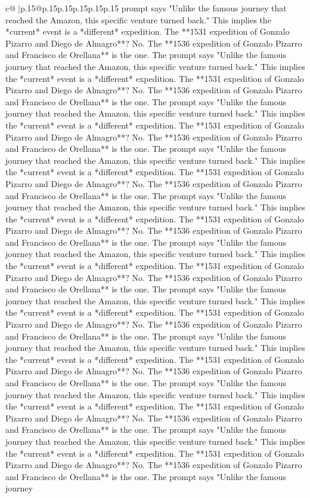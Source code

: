 \documentclass{article}
\begin{document}
{\begin{supertabular}{c@{$\;$}|p{.15\linewidth}@{}p{.15\linewidth}p{.15\linewidth}p{.15\linewidth}p{.15\linewidth}p{.15\linewidth}}
{{{prompt says "Unlike the famous journey that reached the Amazon, this specific venture turned back." This implies the *current* event is a *different* expedition. The **1531 expedition of Gonzalo Pizarro and Diego de Almagro**? No. The **1536 expedition of Gonzalo Pizarro and Francisco de Orellana** is the one. The prompt says "Unlike the famous journey that reached the Amazon, this specific venture turned back." This implies the *current* event is a *different* expedition. The **1531 expedition of Gonzalo Pizarro and Diego de Almagro**? No. The **1536 expedition of Gonzalo Pizarro and Francisco de Orellana** is the one. The prompt says "Unlike the famous journey that reached the Amazon, this specific venture turned back." This implies the *current* event is a *different* expedition. The **1531 expedition of Gonzalo Pizarro and Diego de Almagro**? No. The **1536 expedition of Gonzalo Pizarro and Francisco de Orellana** is the one. The prompt says "Unlike the famous journey that reached the Amazon, this specific venture turned back." This implies the *current* event is a *different* expedition. The **1531 expedition of Gonzalo Pizarro and Diego de Almagro**? No. The **1536 expedition of Gonzalo Pizarro and Francisco de Orellana** is the one. The prompt says "Unlike the famous journey that reached the Amazon, this specific venture turned back." This implies the *current* event is a *different* expedition. The **1531 expedition of Gonzalo Pizarro and Diego de Almagro**? No. The **1536 expedition of Gonzalo Pizarro and Francisco de Orellana** is the one. The prompt says "Unlike the famous journey that reached the Amazon, this specific venture turned back." This implies the *current* event is a *different* expedition. The **1531 expedition of Gonzalo Pizarro and Diego de Almagro**? No. The **1536 expedition of Gonzalo Pizarro and Francisco de Orellana** is the one. The prompt says "Unlike the famous journey that reached the Amazon, this specific venture turned back." This implies the *current* event is a *different* expedition. The **1531 expedition of Gonzalo Pizarro and Diego de Almagro**? No. The **1536 expedition of Gonzalo Pizarro and Francisco de Orellana** is the one. The prompt says "Unlike the famous journey that reached the Amazon, this specific venture turned back." This implies the *current* event is a *different* expedition. The **1531 expedition of Gonzalo Pizarro and Diego de Almagro**? No. The **1536 expedition of Gonzalo Pizarro and Francisco de Orellana** is the one. The prompt says "Unlike the famous journey that reached the Amazon, this specific venture turned back." This implies the *current* event is a *different* expedition. The **1531 expedition of Gonzalo Pizarro and Diego de Almagro**? No. The **1536 expedition of Gonzalo Pizarro and Francisco de Orellana** is the one. The prompt says "Unlike the famous journey that reached the Amazon, this specific venture turned back." This implies the *current* event is a *different* expedition. The **1531 expedition of Gonzalo Pizarro and Diego de Almagro**? No. The **1536 expedition of Gonzalo Pizarro and Francisco de Orellana** is the one. The prompt says "Unlike the famous journey }}}
\end{supertabular}}
\end{document}
